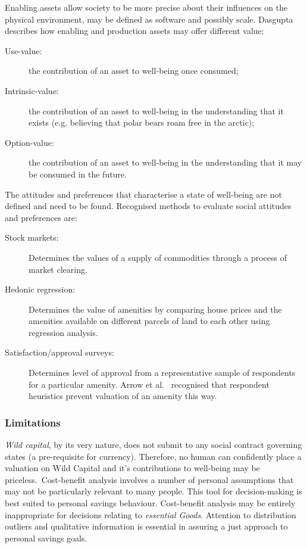 \documentclass[11pt, oneside]{book}   	%
\begin{document}
Enabling assets allow society to be more precise about their influences on the physical environment, may be defined as software and possibly scale. Dasgupta~\cite{pd2} describes how enabling and production assets may offer different value:

\begin{description}
\item[Use-value:] the contribution of an asset to well-being once consumed;
\item[Intrinsic-value:] the contribution of an asset to well-being in the understanding that it exists (e.g. believing that polar bears roam free in the arctic);
\item[Option-value:] the contribution of an asset to well-being in the understanding that it may be consumed in the future.
\end{description}

The attitudes and preferences that characterise a state of well-being are not defined and need to be found. Recognised methods to evaluate social attitudes and preferences are:

\begin{description}
\item[Stock markets:] Determines the values of a supply of commodities through a process of market clearing.
\item[Hedonic regression:] Determines the value of amenities by comparing house prices and the amenities available on different parcels of land to each other using regression analysis.
\item[Satisfaction/approval surveys:] Determines level of approval from a representative sample of respondents for a particular amenity. Arrow et al.~\cite{kja1} recognised that respondent heuristics prevent valuation of an amenity this way.
\end{description}

\subsubsection{Limitations}

\emph{Wild capital}, by its very nature, does not submit to any social contract governing states (a pre-requisite for currency).
Therefore, no human can confidently place a valuation on Wild Capital and it's contributions to well-being may be priceless.\
Cost-benefit analysis involves a number of personal assumptions that may not be particularly relevant to many people. This tool for decision-making is best suited to personal savings behaviour.
Cost-benefit analysis may be entirely inappropriate for decisions relating to \emph{essential Goods}.
Attention to distribution outliers and qualitative information is essential in assuring a just approach to personal savings goals.
\end{document}
